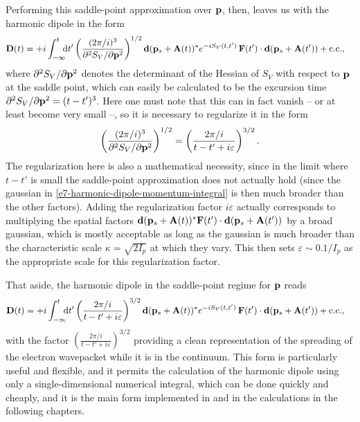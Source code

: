 Performing this saddle-point approximation over $\vb{p}$, then, leaves us with the harmonic dipole in the form
\begin{align}
\vb{D}(t)
& = 
+i\int_{-\infty}^{t} \!\!\! \mathrm{d} t'
\left(\frac{(2\pi/i)^3}{\partial^2 S_V/\partial \vb{p}^2}\right)^{1/2}
\vb{d}(\vb{p}_s+\vb{A}(t))^*
e^{-iS_V(t,t')}  \,
\vb{F}(t')\cdot \vb{d}(\vb{p}_s+\vb{A}(t'))
+\mathrm{c.c.}
,
\label{e7-harmonic-dipole-momentum-spa}
\end{align}
where $\partial^2 S_V/\partial \vb{p}^2$ denotes the determinant of the Hessian of $S_V$ with respect to $\vb{p}$ at the saddle point, which can easily be calculated to be the excursion time $\partial^2 S_V/\partial \vb{p}^2 = (t-t')^3$. Here one must note that this can in fact vanish -- or at least become very small --, so it is necessary to regularize it in the form
\begin{equation}
\left(\frac{(2\pi/i)^3}{\partial^2 S_V/\partial \vb{p}^2}\right)^{1/2}
=
\left(\frac{2\pi/i}{t-t' + i\varepsilon}\right)^{3/2}
.
\end{equation}
The regularization here is also a mathematical necessity, since in the limit where $t-t'$ is small the saddle-point approximation does not actually hold (since the gaussian in \eqref{e7-harmonic-dipole-momentum-integral} is then much broader than the other factors). Adding the regularization factor $i\varepsilon$ actually corresponds to multiplying the spatial factors $\vb{d}(\vb{p}_s+\vb{A}(t))^*\vb{F}(t')\cdot \vb{d}(\vb{p}_s+\vb{A}(t'))$ by a broad gaussian, which is mostly acceptable as long as the gaussian is much broader than the characteristic scale $\kappa = \sqrt{2I_p}$ at which they vary. This then sets $\varepsilon \sim 0.1/I_p$ as the appropriate scale for this regularization factor.

That aside, the harmonic dipole in the saddle-point regime for $\vb{p}$ reads
\begin{align}
\vb{D}(t)
& = 
+i\int_{-\infty}^{t} \!\!\! \mathrm{d} t'
\left(\frac{2\pi/i}{t-t' + i\varepsilon}\right)^{3/2}
\vb{d}(\vb{p}_s+\vb{A}(t))^*
e^{-iS_V(t,t')}  \,
\vb{F}(t')\cdot \vb{d}(\vb{p}_s+\vb{A}(t'))
+\mathrm{c.c.}
,
\label{e7-harmonic-dipole-final}
\end{align}
with the factor $\left(\frac{2\pi/i}{t-t' + i\varepsilon}\right)^{3/2}$ providing a clean representation of the spreading of the electron wavepacket while it is in the continuum. This form is particularly useful and flexible, and it permits the calculation of the harmonic dipole using only a single-dimensional numerical integral, which can be done quickly and cheaply, and it is the main form implemented in  and in the calculations in the following chapters.



